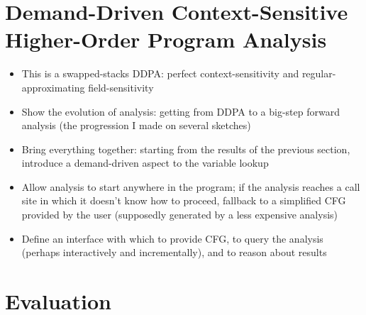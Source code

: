 \documentclass[12pt, oneside]{book}
\begin{document}
\chapter{Demand-Driven Context-Sensitive Higher-Order Program Analysis}
\label{section:demand-driven-context-sensitive-higher-order-program-analysis}

\begin{itemize}
  \item This is a swapped-stacks DDPA: perfect context-sensitivity and regular-approximating field-sensitivity
  \item Show the evolution of analysis: getting from DDPA to a big-step forward analysis (the progression I made on several sketches)
  \item Bring everything together: starting from the results of the previous section, introduce a demand-driven aspect to the variable lookup
  \item Allow analysis to start anywhere in the program; if the analysis reaches a call site in which it doesn’t know how to proceed, fallback to a simplified CFG provided by the user (supposedly generated by a less expensive analysis)
  \item Define an interface with which to provide CFG, to query the analysis (perhaps interactively and incrementally), and to reason about results
\end{itemize}

\chapter{Evaluation}
\label{section:evalutation}
\end{document}
